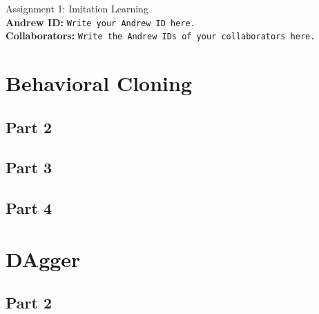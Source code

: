\documentclass{article}
\begin{document}

\begin{centering}
    {\Large Assignment 1: Imitation Learning} \\
    \vspace{.25cm}
    \textbf{Andrew ID:} \texttt{Write your Andrew ID here.} \\
    \textbf{Collaborators:} \texttt{Write the Andrew IDs of your collaborators here.}\\ 
\end{centering}

\vspace{.5cm}

\section{Behavioral Cloning}
\subsection{Part 2}
\subsection{Part 3}
\subsection{Part 4}

\section{DAgger}
\subsection{Part 2}
\end{document}
